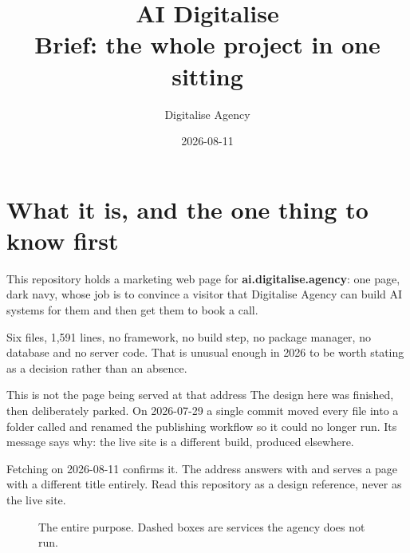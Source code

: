\documentclass[11pt,a4paper]{article}
\title{AI Digitalise\\[2mm]\large Brief: the whole project in one sitting}
\author{Digitalise Agency}
\date{2026-08-11}
\begin{document}
\maketitle
\tableofcontents
\newpage

\section{What it is, and the one thing to know first}

This repository holds a marketing web page for \textbf{ai.digitalise.agency}: one
page, dark navy, whose job is to convince a visitor that Digitalise Agency can
build AI systems for them and then get them to book a call.

Six files, 1{,}591 lines, no framework, no build step, no package manager, no
database and no server code. That is unusual enough in 2026 to be worth stating
as a decision rather than an absence.

\begin{keyidea}{This is not the page being served at that address}
The design here was finished, then deliberately parked. On 2026-07-29 a single
commit moved every file into a folder called  and
renamed the publishing workflow so it could no longer run. Its message says why:
the live site is a different build, produced elsewhere.

Fetching  on 2026-08-11 confirms it. The
address answers with  and serves a page with a different title
entirely. Read this repository as a design reference, never as the live site.
\end{keyidea}

\begin{figure}[H]\centering
{}
\caption{The entire purpose. Dashed boxes are services the agency does not run.}
\end{figure}
\end{document}
